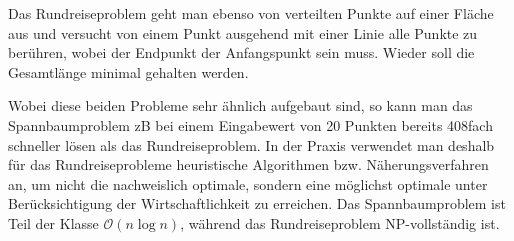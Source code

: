 Das Rundreiseproblem geht man ebenso von verteilten Punkte auf einer
Fläche aus und versucht von einem Punkt ausgehend mit einer Linie
alle Punkte zu berühren, wobei der Endpunkt der Anfangspunkt sein
muss. Wieder soll die Gesamtlänge minimal gehalten werden.

Wobei diese beiden Probleme sehr ähnlich aufgebaut sind, so kann man das
Spannbaumproblem zB bei einem Eingabewert von 20 Punkten bereits
408fach schneller lösen als das Rundreiseproblem. In der Praxis verwendet
man deshalb für das Rundreiseprobleme heuristische Algorithmen bzw.
Näherungsverfahren an, um nicht die nachweislich optimale, sondern eine
möglichst optimale unter Berücksichtigung der Wirtschaftlichkeit zu
erreichen. Das Spannbaumproblem ist Teil der Klasse $\mathcal{O}(n\log n)$,
während das Rundreiseproblem NP-vollständig ist.


